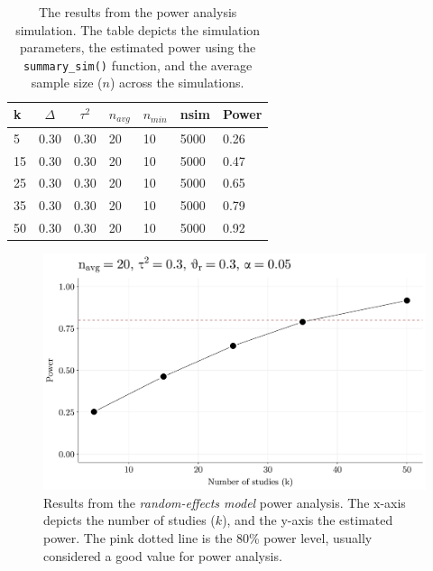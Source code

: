 \documentclass[
  man,floatsintext]{apa6}
\begin{document}
\scriptsize

\begin{table}[H]

\begin{center}
\begin{threeparttable}

\caption{\label{tab:tab-power-analysis-example}The results from the power analysis simulation. The table depicts the simulation parameters, the estimated power using the \texttt{summary\_sim()} function, and the average sample size (\(n\)) across the simulations.}

\small{

\begin{tabular}{lllllll}
\toprule
k & \multicolumn{1}{c}{$\Delta$} & \multicolumn{1}{c}{$\tau^2$} & \multicolumn{1}{c}{$n_{avg}$} & \multicolumn{1}{c}{$n_{min}$} & \multicolumn{1}{c}{nsim} & \multicolumn{1}{c}{Power}\\
\midrule
5 & 0.30 & 0.30 & 20 & 10 & 5000 & 0.26\\
15 & 0.30 & 0.30 & 20 & 10 & 5000 & 0.47\\
25 & 0.30 & 0.30 & 20 & 10 & 5000 & 0.65\\
35 & 0.30 & 0.30 & 20 & 10 & 5000 & 0.79\\
50 & 0.30 & 0.30 & 20 & 10 & 5000 & 0.92\\
\bottomrule
\end{tabular}

}

\end{threeparttable}
\end{center}

\end{table}

\normalsize

\scriptsize

\begin{figure}[H]

{\centering \includegraphics[width=0.8\linewidth]{paper_files/figure-latex/plot-power-analysis-1} 

}

\caption{Results from the \emph{random-effects model} power analysis. The x-axis depicts the number of studies (\(k\)), and the y-axis the estimated power. The pink dotted line is the 80\% power level, usually considered a good value for power analysis.}\label{fig:plot-power-analysis}
\end{figure}
\end{document}
